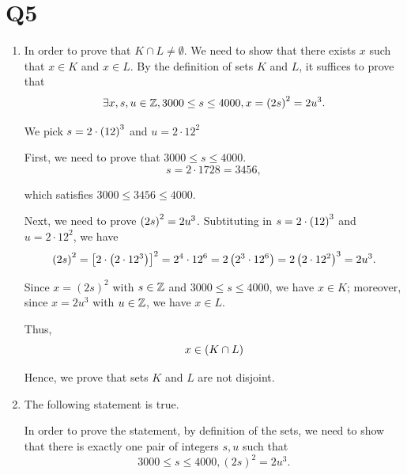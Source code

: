 \section{Q5}
\begin{enumerate}[label = (\alph*)]
    \item \begin{solution}
        In order to prove that $K \cap L \neq \emptyset$. We need to show that there exists $x$ such that 
        $x \in K$ and $x \in L$. By the definition of sets $K$ and $L$, it suffices to prove that 
        \begin{equation*}
            \exists x, s, u \in \mathbb{Z}, 3000 \leq s \leq 4000, x = \left(2s\right)^2 = 2u^3. 
        \end{equation*} 

        We pick $s = 2 \cdot \left(12\right)^3$ and $u = 2 \cdot 12^2$

        First, we need to prove that $3000 \leq s \leq 4000$. 
        \begin{equation*}
            s = 2 \cdot 1728 = 3456,  
        \end{equation*}

        which satisfies $3000 \leq 3456 \leq 4000$. 

        Next, we need to prove $\left(2s\right)^2 = 2u^3$. Subtituting in $s = 2 \cdot \left(12\right)^3$ and $u = 2 \cdot 12^2$, we have 
        \begin{equation*}
            \left(2s\right)^2 = \left[2 \cdot \left(2 \cdot 12^3\right)\right]^2 = 2^4 \cdot 12^6  = 2 \left(2^3 \cdot 12^6\right)= 2 \left(2 \cdot 12^2\right)^3 = 2u^3. 
        \end{equation*}

        Since $x=(2s)^2$ with $s\in\mathbb{Z}$ and $3000\leq s\leq 4000$, we have $x\in K$; moreover, since $x=2u^3$ with $u\in\mathbb{Z}$, we have $x\in L$.

        Thus, 
        \begin{equation*}
            x \in \left(K \cap L\right)
        \end{equation*}

        Hence,  we prove that sets $K$ and $L$ are not disjoint. 
    \end{solution}

    \newpage

    \item \begin{solution}
        The following statement is true.

In order to prove the statement, by definition of the sets, we need to show that there is exactly one pair of integers $s,u$ such that
\begin{equation*}
    3000 \leq s \leq 4000,
    (2s)^2 = 2u^3.
\end{equation*}


\end{solution}
\end{enumerate}
